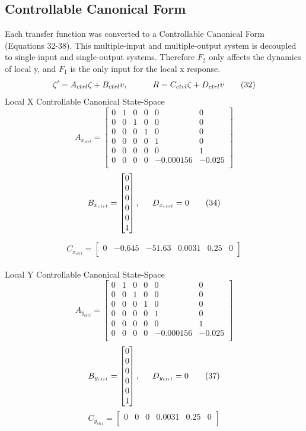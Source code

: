 \documentclass[conference]{IEEEtran}
\begin{document}
\subsection{Controllable Canonical Form}
Each transfer function was converted to a Controllable Canonical Form (Equations 32-38). This multiple-input and multiple-output system is decoupled to single-input and single-output systems. Therefore $F_2$ only affects the dynamics of local y, and $F_1$ is the only input for the local x response. 
\[
\zeta^\prime = A_{ctrl}\zeta + B_{ctrl}v, \indent \indent R = C_{ctrl}\zeta + D_{ctrl}v
\tag{32}
\] 
Local X Controllable Canonical State-Space\\
\[
A_{x_{ctrl}} = 
\begin{bmatrix}
0&1& 0& 0& 0 &0\\
0 &0 &1 &0 &0 &0\\
0 &0 &0 &1 &0 &0\\
0 &0 &0& 0&1 &0\\
0 &0 &0 &0 &0&1\\
0 &0&0&0&-0.000156&-0.025\\
\end{bmatrix}
\tag{33}
\]
\[
B_{x_{ctrl}} = 
\begin{bmatrix}
0 \\
0\\
0\\
0\\
0\\
1\\
\end{bmatrix},
\indent D_{x_{ctrl}} = 0
\tag{34}
\] 

\[
C_{x_{ctrl}} = 
\begin{bmatrix}
0&-0.645&-51.63&0.0031&0.25&0\\
\end{bmatrix}
\tag{35}
\]
\\
Local Y Controllable Canonical State-Space\\ 
\[
A_{y_{ctrl}} = 
\begin{bmatrix}
0&1& 0& 0& 0 &0\\
0 &0 &1 &0 &0 &0\\
0 &0 &0 &1 &0 &0\\
0 &0 &0& 0&1 &0\\
0 &0 &0 &0 &0&1\\
0 &0&0&0&-0.000156&-0.025\\
\end{bmatrix}
\tag{36}
\]
\[
B_{y_{ctrl}} = 
\begin{bmatrix}
0\\
0\\
0\\
0\\
0\\
1\\
\end{bmatrix},
\indent D_{y_{ctrl}} = 0
\tag{37}
\] 
\[
C_{y_{ctrl}} = 
\begin{bmatrix}
0&0&0&0.0031&0.25&0\\
\end{bmatrix}
\tag{38}
\]
\end{document}

